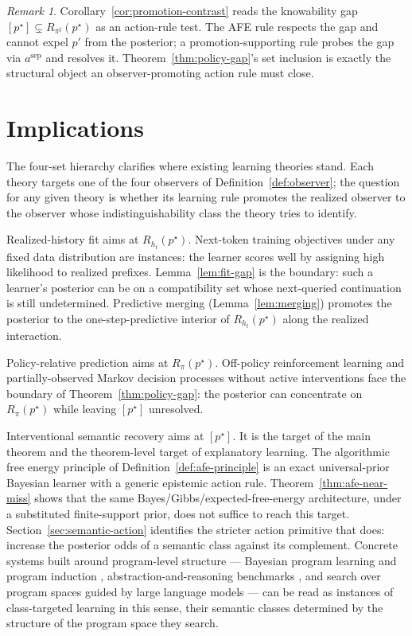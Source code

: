 \documentclass[11pt]{article}
\theoremstyle{definition}
\theoremstyle{remark}
\newtheorem{remark}[theorem]{Remark}
\begin{document}
\begin{remark}
\label{rem:promotion-contrast-interpretation}
Corollary~\ref{cor:promotion-contrast} reads the knowability gap $[p^\star]\subsetneq R_{\pi^\sharp}(p^\star)$ as an action-rule test. The AFE rule respects the gap and cannot expel $p'$ from the posterior; a promotion-supporting rule probes the gap via $a^{\mathrm{sep}}$ and resolves it. Theorem~\ref{thm:policy-gap}'s set inclusion is exactly the structural object an observer-promoting action rule must close.
\end{remark}

\section{Implications}
\label{sec:implications}

The four-set hierarchy clarifies where existing learning theories stand. Each theory targets one of the four observers of Definition~\ref{def:observer}; the question for any given theory is whether its learning rule promotes the realized observer to the observer whose indistinguishability class the theory tries to identify.

Realized-history fit aims at $R_{h_t}(p^\star)$. Next-token training objectives under any fixed data distribution are instances: the learner scores well by assigning high likelihood to realized prefixes. Lemma~\ref{lem:fit-gap} is the boundary: such a learner's posterior can be on a compatibility set whose next-queried continuation is still undetermined. Predictive merging (Lemma~\ref{lem:merging}) promotes the posterior to the one-step-predictive interior of $R_{h_t}(p^\star)$ along the realized interaction.

Policy-relative prediction aims at $R_\pi(p^\star)$. Off-policy reinforcement learning and partially-observed Markov decision processes without active interventions face the boundary of Theorem~\ref{thm:policy-gap}: the posterior can concentrate on $R_\pi(p^\star)$ while leaving $[p^\star]$ unresolved.

Interventional semantic recovery aims at $[p^\star]$. It is the target of the main theorem and the theorem-level target of explanatory learning. The algorithmic free energy principle of Definition~\ref{def:afe-principle} is an exact universal-prior Bayesian learner with a generic epistemic action rule. Theorem~\ref{thm:afe-near-miss} shows that the same Bayes/Gibbs/expected-free-energy architecture, under a substituted finite-support prior, does not suffice to reach this target. Section~\ref{sec:semantic-action} identifies the stricter action primitive that does: increase the posterior odds of a semantic class against its complement. Concrete systems built around program-level structure --- Bayesian program learning and program induction \citep{LakeEtAl2015,EllisEtAl2021DreamCoder}, abstraction-and-reasoning benchmarks \citep{Chollet2024ARC}, and search over program spaces guided by large language models \citep{RomeraParedesEtAl2024FunSearch} --- can be read as instances of class-targeted learning in this sense, their semantic classes determined by the structure of the program space they search.
\end{document}
